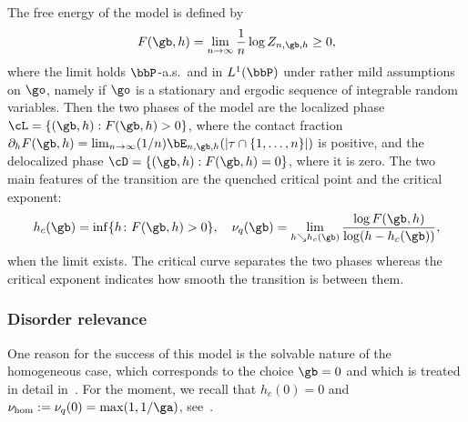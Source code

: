 The free energy of the model is defined by
\begin{equation}
F(\gb,h) = \lim_{n \to \infty} \frac{1}{n} \log Z_{n,\gb,h} \geq 0,
\end{equation}
where the limit holds $\bbP$-a.s.~and in $L^1(\bbP)$ under rather mild assumptions on $\go$, namely if $\go$ is a stationary and ergodic sequence of integrable random variables. Then the two phases of the model are the localized phase $\cL = \{(\gb, h): F(\gb, h)>0\}$, where the contact fraction $\partial_h F(\gb,h) = \lim_{n \to \infty} (1/n) \bE_{n,\gb,h}(|\tau \cap \{1,\ldots,n\}|)$ is positive, and the delocalized phase $\cD = \{(\gb, h): F(\gb, h)=0\}$, where it is zero. The two main features of the transition are the quenched critical point and the critical exponent:
\begin{equation}
h_c(\gb) = \inf\{h \colon F(\gb,h) > 0\},\quad \nu_q(\gb) = \lim_{h \searrow h_c(\gb)} \frac{\log F(\gb,h)}{\log (h - h_c(\gb))},
\end{equation}
when the limit exists. The critical curve separates the two phases whereas the critical exponent indicates how smooth the transition is between them.

\subsubsection{Disorder relevance}

One reason for the success of this model is the solvable nature of the homogeneous case, which corresponds to the choice $\gb = 0$ and which is treated in detail in~\cite{Gi2007}. For the moment, we recall that $h_c(0) = 0$ and $\nu_{\hom}:= \nu_q(0) = \max(1,1/\ga)$, see~\cite[Theorem~2.1]{Gi2007}.

